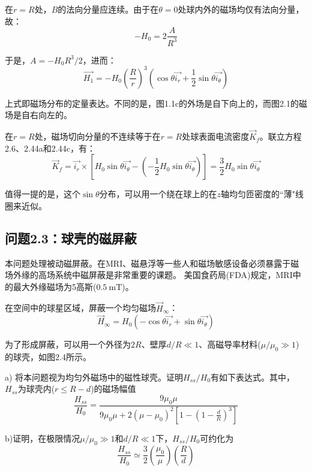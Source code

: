 在$r=R$处，$B$的法向分量应连续。由于在$\theta=0$处球内外的磁场均仅有法向分量，故：
$$
-H_0=2\frac{A}{R^3}
$$

于是，$A=-H_0 R^3/2$，进而：
\begin{equation*}
\vec{H_1}=-H_0\left(\frac{R}{r}\right)^3 (\cos\theta \vec{i_r}+\frac{1}{2}\sin\theta \vec{i_\theta}) \tag{2.44c}
\end{equation*}


上式即磁场分布的定量表达。不同的是，图1.1c的外场是自下向上的，而图2.1的磁场是自右向左的。

在$r=R$处，磁场切向分量的不连续等于在$r=R$处球表面电流密度$\vec{K}_f$。联立方程2.6、2.44a和2.44c，有：
\begin{equation}
  \vec{K}_f=\vec{i_r}\times \left[H_0 \sin\theta \vec{i_\theta}-(-\frac{1}{2}H_0 \sin\theta \vec{i_\theta})\right]=\frac{3}{2}H_0\sin\theta\vec{i_\theta}
\end{equation}

值得一提的是，这个$\sin\theta$分布，可以用一个绕在球上的在$z$轴均匀匝密度的``薄"线圈来近似。




\subsection{问题2.3：球壳的磁屏蔽}
本问题处理被动磁屏蔽。在MRI、磁悬浮等一些人和磁场敏感设备必须暴露于磁场外缘的高场系统中磁屏蔽是非常重要的课题。
美国食药局(FDA)规定，MRI中的最大外缘磁场为5高斯($0.5\ \mathrm{mT}$)。

在空间中的球星区域，屏蔽一个均匀磁场$\vec{H}_\infty$：
\begin{equation*}
\vec{H}_\infty=H_0 (-\cos\theta \vec{i_r}+\sin\theta \vec{i_\theta})\tag{2.40}
\end{equation*}

为了形成屏蔽，可以用一个外径为$2R$、壁厚$d/R\ll 1$、高磁导率材料($\mu/\mu_0 \gg 1$)的球壳，如图2.4所示。

a) 将本问题视为均匀外磁场中的磁性球壳。证明$H_{ss}/H_0$有如下表达式。其中，$H_{ss}$为球壳内($r\le R-d$)的磁场幅值
\begin{equation}
\frac{H_{ss}}{H_0}=\frac{9\mu_0 \mu}{9\mu_0 \mu+2(\mu-\mu_0)^2\left[1-\left(1-\frac{d}{R}\right)^3\right]}
\end{equation}

b)证明，在极限情况$\mu/\mu_0\gg 1$和$d/R\ll 1$下，$H_{ss}/H_0$可约化为
\begin{equation}
\frac{H_{ss}}{H_0}\simeq \frac{3}{2}(\frac{\mu_0}{\mu})(\frac{R}{d})
\end{equation}

